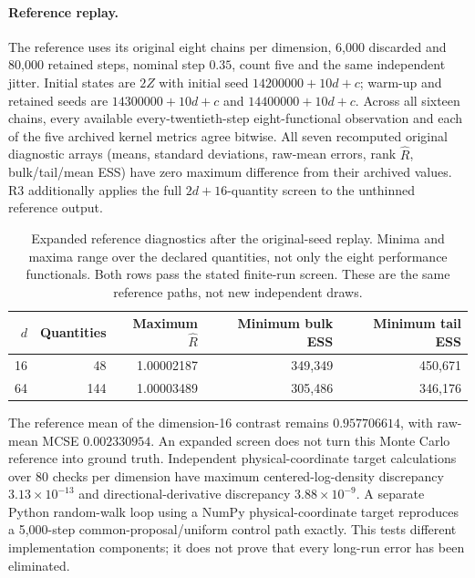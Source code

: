 \documentclass[11pt]{article}
\theoremstyle{definition}\newtheorem{definition}[theorem]{Definition}
\theoremstyle{remark}\newtheorem{remark}[theorem]{Remark}
\numberwithin{equation}{section}
\newcommand{\1}{\mathbf 1}
\begin{document}
\paragraph{Reference replay.}
The reference uses its original eight chains per dimension, 6,000 discarded and 80,000 retained steps, nominal step $0.35$, count five and the same independent jitter. Initial states are $2Z$ with initial seed $14200000+10d+c$; warm-up and retained seeds are $14300000+10d+c$ and $14400000+10d+c$. Across all sixteen chains, every available every-twentieth-step eight-functional observation and each of the five archived kernel metrics agree bitwise. All seven recomputed original diagnostic arrays (means, standard deviations, raw-mean errors, rank $\widehat R$, bulk/tail/mean ESS) have zero maximum difference from their archived values. R3 additionally applies the full $2d+16$-quantity screen to the unthinned reference output.

\begin{table}[!htbp]\centering\small
\caption{Expanded reference diagnostics after the original-seed replay. Minima and maxima range over the declared quantities, not only the eight performance functionals. Both rows pass the stated finite-run screen. These are the same reference paths, not new independent draws.}\label{tab:reference_r3}
\begin{tabular}{rrrrr}\toprule
$d$&Quantities&Maximum $\widehat R$&Minimum bulk ESS&Minimum tail ESS\\\midrule
16&48&1.00002187&349,349&450,671\\
64&144&1.00003489&305,486&346,176\\
\bottomrule\end{tabular}\end{table}
The reference mean of the dimension-16 contrast remains $0.957706614$, with raw-mean MCSE $0.002330954$. An expanded screen does not turn this Monte Carlo reference into ground truth. Independent physical-coordinate target calculations over 80 checks per dimension have maximum centered-log-density discrepancy $3.13\times10^{-13}$ and directional-derivative discrepancy $3.88\times10^{-9}$. A separate Python random-walk loop using a NumPy physical-coordinate target reproduces a 5,000-step common-proposal/uniform control path exactly. This tests different implementation components; it does not prove that every long-run error has been eliminated.
\end{document}
